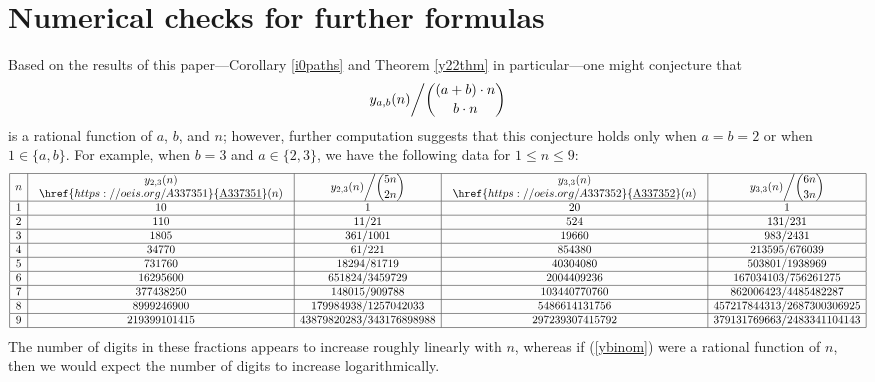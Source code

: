\documentclass[10pt]{article}
\newcommand{\eqn}[1]{\begin{equation*} #1 \end{equation*}}
\newcommand{\neqn}[1]{\begin{equation} #1 \end{equation}}
\newcommand{\seqnum}[1]{\href{https://oeis.org/#1}{\rm \underline{#1}}}
\begin{document}
\appendix

\section{Numerical checks for further formulas}\label{app:numerics}
Based on the results of this paper---Corollary \ref{i0paths} and Theorem \ref{y22thm} in particular---one might conjecture that
\neqn{y_{a,b}(n)\bigg/\dbinom{(a+b)\cdot n}{b\cdot n} \label{ybinom}}
is a rational function of $a$, $b$, and $n$; however, further computation suggests that this conjecture holds only when $a=b=2$ or when $1\in\{a,b\}$.  For example, when $b=3$ and $a\in\{2,3\}$, we have the following data for $1\leq n\leq9$:
\eqn{\begin{array}{|c|c|c|c|c|}\hline
n & \begin{array}{c}y_{2,3}(n)\\\seqnum{A337351}(n)\end{array} & y_{2,3}(n)\bigg/\dbinom{5n}{2n} & \begin{array}{c}y_{3,3}(n)\\\seqnum{A337352}(n)\end{array} & y_{3,3}(n)\bigg/\dbinom{6n}{3n} \\\hline
1 &           10 &                               1 &              20 &                               1 \\\hline
2 &          110 &                           11/21 &             524 &                         131/231 \\\hline
3 &         1805 &                        361/1001 &           19660 &                        983/2431 \\\hline
4 &        34770 &                          61/221 &          854380 &                   213595/676039 \\\hline
5 &       731760 &                     18294/81719 &        40304080 &                  503801/1938969 \\\hline
6 &     16295600 &                  651824/3459729 &      2004409236 &             167034103/756261275 \\\hline
7 &    377438250 &                   148015/909788 &    103440770760 &            862006423/4485482287 \\\hline
8 &   8999246900 &            179984938/1257042033 &   5486614131756 &      457217844313/2687300306925 \\\hline
9 & 219399101415 &        43879820283/343176898988 & 297239307415792 &      379131769663/2483341104143 \\\hline
\end{array}}
The number of digits in these fractions appears to increase roughly linearly with $n$, whereas if (\ref{ybinom}) were a rational function of $n$, then we would expect the number of digits to increase logarithmically.
\end{document}
